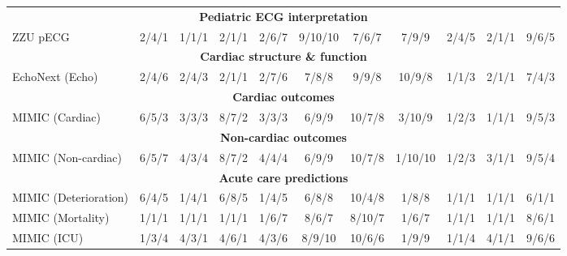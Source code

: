 \documentclass{article}
\begin{document}
\begin{table}[htbp]
\begin{tabular}{lcccccccccc}
                    \multicolumn{11}{c}{\textbf{Pediatric ECG interpretation }} \\
                    ZZU pECG & 2/4/1 & 1/1/1 & 2/1/1 & 2/6/7 & 9/10/10 & 7/6/7 & 7/9/9 & 2/4/5 & 2/1/1 & 9/6/5 \\
                    \midrule
        
                    \multicolumn{11}{c}{\textbf{Cardiac structure \& function }} \\
                    EchoNext (Echo) & 2/4/6 & 2/4/3 & 2/1/1 & 2/7/6 & 7/8/8 & 9/9/8 & 10/9/8 & 1/1/3 & 2/1/1 & 7/4/3 \\
                    \midrule
        
                    \multicolumn{11}{c}{\textbf{Cardiac outcomes }} \\
                    MIMIC (Cardiac) & 6/5/3 & 3/3/3  & 8/7/2  & 3/3/3  & 6/9/9  & 10/7/8  & 3/10/9  & 1/2/3  & 1/1/1  & 9/5/3  \\
                    \midrule
        
                    \multicolumn{11}{c}{\textbf{Non-cardiac outcomes }} \\
                    MIMIC (Non-cardiac) & 6/5/7 & 4/3/4  & 8/7/2  & 4/4/4  & 6/9/9  & 10/7/8  & 1/10/10  & 1/2/3  & 3/1/1  & 9/5/4  \\
                    \midrule
        
                    \multicolumn{11}{c}{\textbf{Acute care predictions }} \\
                    MIMIC (Deterioration) & 6/4/5 & 1/4/1  & 6/8/5  & 1/4/5  & 6/8/8  &  10/4/8  & 1/8/8  & 1/1/1  & 1/1/1  & 6/1/1  \\
                    MIMIC (Mortality) & 1/1/1 & 1/1/1  & 1/1/1  & 1/6/7  & 8/6/7  & 8/10/7  & 1/6/7  & 1/1/1  & 1/1/1  & 8/6/1  \\
                    MIMIC (ICU) & 1/3/4 & 4/3/1  & 4/6/1  & 4/3/6  & 8/9/10  & 10/6/6  & 1/9/9  & 1/1/4  & 4/1/1  & 9/6/6  \\
                    \midrule
        

\end{tabular}
\end{table}
\end{document}
